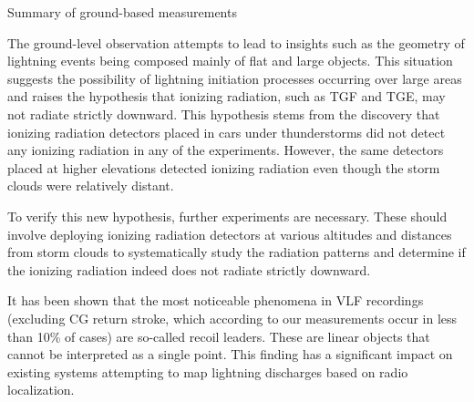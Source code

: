 \secc Summary of ground-based measurements

The ground-level observation attempts to lead to insights such as the geometry of lightning events being composed mainly of flat and large objects. This situation suggests the possibility of lightning initiation processes occurring over large areas and raises the hypothesis that ionizing radiation, such as TGF and TGE, may not radiate strictly downward. This hypothesis stems from the discovery that ionizing radiation detectors placed in cars under thunderstorms did not detect any ionizing radiation in any of the experiments. However, the same detectors placed at higher elevations detected ionizing radiation even though the storm clouds were relatively distant.

To verify this new hypothesis, further experiments are necessary. These should involve deploying ionizing radiation detectors at various altitudes and distances from storm clouds to systematically study the radiation patterns and determine if the ionizing radiation indeed does not radiate strictly downward.

It has been shown that the most noticeable phenomena in VLF recordings (excluding CG return stroke, which according to our measurements occur in less than 10\% of cases) are so-called recoil leaders. These are linear objects that cannot be interpreted as a single point. This finding has a significant impact on existing systems attempting to map lightning discharges based on radio localization.
